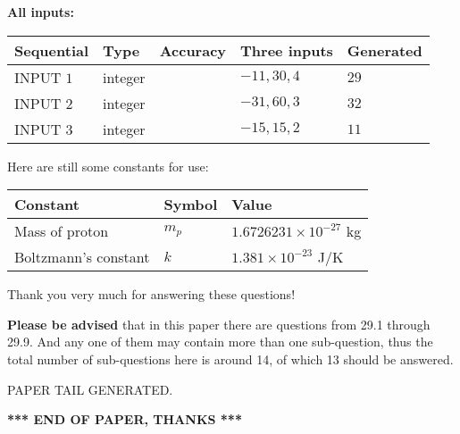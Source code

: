 \documentclass[12pt]{article}
\begin{document}
   
   
   
\noindent\vspace{0.1in}\hspace{-0.08in} {\textbf{\Large{All inputs: }}}
   
   
  
  
\noindent\begin{tabular}{|l|l|l|l|l|}
\hline
 Sequential & Type & Accuracy & Three inputs & Generated \\ 
\hline
 
 
  INPUT $            1 $ & integer &  & $
 -11
 , 
 30
 , 
 4
 $ & $ 29 $ 
 \\  \hline  
 
 
  INPUT $            2 $ & integer &  & $
 -31
 , 
 60
 , 
 3
 $ & $ 32 $ 
 \\  \hline  
 
 
  INPUT $            3 $ & integer &  & $
 -15
 , 
 15
 , 
 2
 $ & $ 11 $ 
 \\  \hline  
 \end{tabular}
   
   
   
   
   
   
 \vspace{0.2in}
Here are still some constants for use:
 
 
\noindent\begin{tabular}{|l|l|l|}
\hline
Constant & Symbol & Value \\
\hline
 
Mass of proton &
$m_p$ &
 $ 1.6726231 \times 10^{-27} $
kg \\
\hline
 
Boltzmann's constant &
$k$ &
 $ 1.381 \times 10^{-23} $
J/K \\
\hline
 
\end{tabular}
 
Thank you very much for answering these questions!
 
{\textbf{\large{Please be advised}}} that in this paper there are questions from
29.1 through
29.9.
And any one of them may contain more than one sub-question, thus the total number
of sub-questions here is around 14, of which
13 should be answered.
 
   
   
\vspace{2.0in} PAPER TAIL GENERATED.
   
   
   
   
\vspace{1.0in} 
{\textbf{\large{ *** END OF PAPER, THANKS *** }}} 
   
\end{document}
